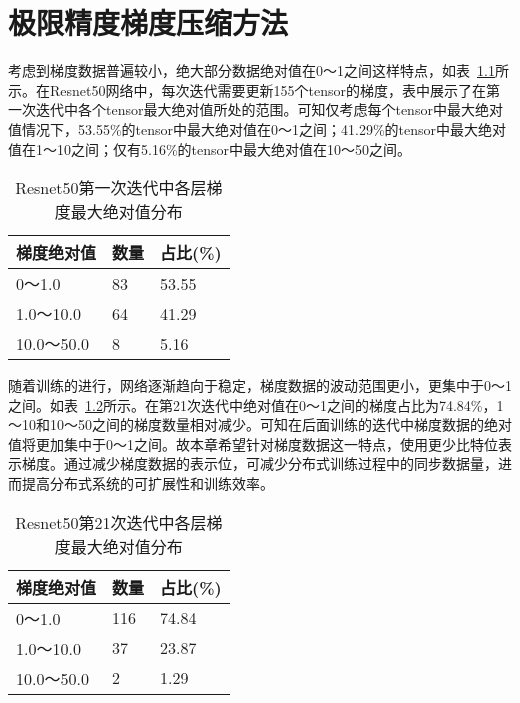 \chapter{极限精度梯度压缩方法}
考虑到梯度数据普遍较小，绝大部分数据绝对值在0～1之间这样特点，如表~\ref{tab:resnet50_1iter_grad_fabs}所示。在Resnet50网络中，每次迭代需要更新155个tensor的梯度，表中展示了在第一次迭代中各个tensor最大绝对值所处的范围。可知仅考虑每个tensor中最大绝对值情况下，53.55\%的tensor中最大绝对值在0～1之间；41.29\%的tensor中最大绝对值在1～10之间；仅有5.16\%的tensor中最大绝对值在10～50之间。
\begin{table}[htb]
\centering
\noindent\begin{minipage}{0.65\textwidth}
\centering
\caption{Resnet50第一次迭代中各层梯度最大绝对值分布}
\label{tab:resnet50_1iter_grad_fabs}
\begin{tabular}{p{2.5cm}p{2.5cm}p{2.5cm}}
\toprule[1.5pt]
梯度绝对值 & 数量 & 占比(\%) \\\midrule[1pt]
0～1.0 & 83 & 53.55\\
1.0～10.0 & 64 & 41.29\\
10.0～50.0 & 8 & 5.16\\
\midrule[1pt]
\end{tabular}
\end{minipage}
\end{table}

随着训练的进行，网络逐渐趋向于稳定，梯度数据的波动范围更小，更集中于0～1之间。如表~\ref{tab:resnet50_21iter_grad_fabs}所示。在第21次迭代中绝对值在0～1之间的梯度占比为74.84\%，1～10和10～50之间的梯度数量相对减少。可知在后面训练的迭代中梯度数据的绝对值将更加集中于0～1之间。故本章希望针对梯度数据这一特点，使用更少比特位表示梯度。通过减少梯度数据的表示位，可减少分布式训练过程中的同步数据量，进而提高分布式系统的可扩展性和训练效率。
\begin{table}[htb]
\centering
\noindent\begin{minipage}{0.65\textwidth}
\centering
\caption{Resnet50第21次迭代中各层梯度最大绝对值分布}
\label{tab:resnet50_21iter_grad_fabs}
\begin{tabular}{p{2.5cm}p{2.5cm}p{2.5cm}}
\toprule[1.5pt]
梯度绝对值 & 数量 & 占比(\%) \\\midrule[1pt]
0～1.0 & 116 & 74.84\\
1.0～10.0 & 37 & 23.87\\
10.0～50.0 & 2 & 1.29\\
\midrule[1pt]
\end{tabular}
\end{minipage}
\end{table}


